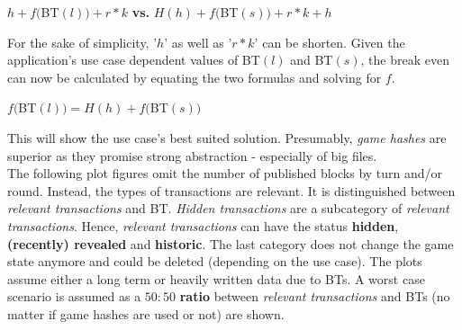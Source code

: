 \begin{center}
	$h + f($\gls{BT}$(l)) + r * k$ \hspace{0.2cm} \textbf{vs.} \hspace{0.2cm} $H(h) + f($\gls{BT}$(s)) + r * k + h$
\end{center}
For the sake of simplicity, '$h$' as well as '$r * k$' can be shorten.
Given the application's use case dependent values of \gls{BT}$(l)$ and \gls{BT}$(s)$,
the break even can now be calculated by equating the two formulas and solving for $f$.
\begin{center}
	$f($\gls{BT}$(l)) = H(h) + f($\gls{BT}$(s))$
\end{center}
This will show the use case's best suited solution.
Presumably, \textit{game hashes} are superior as they promise strong abstraction - especially of big files. \\

\noindent The following plot figures omit the number of published blocks by turn and/or round.
Instead, the types of transactions are relevant.
It is distinguished between \textit{relevant transactions} and \gls{BT}.
\textit{Hidden transactions} are a subcategory of \textit{relevant transactions}.
Hence, \textit{relevant transactions} can have the status \textbf{hidden}, \textbf{(recently) revealed} and \textbf{historic}.
The last category does not change the game state anymore and could be deleted (depending on the use case).
The plots assume either a long term or heavily written data due to \gls{BT}s.
A worst case scenario is assumed as a $50:50$ \textbf{ratio} between \textit{relevant transactions}
and \gls{BT}s (no matter if game hashes are used or not) are shown.
\begin{figure}
\end{figure}

